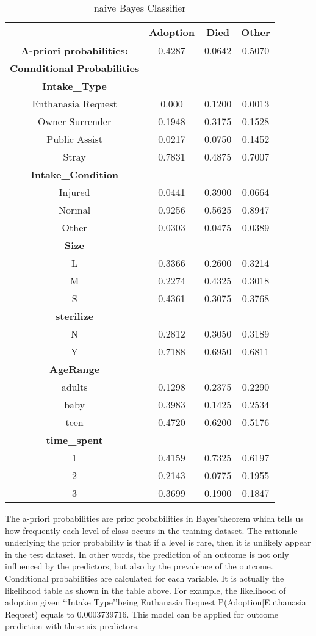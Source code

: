 \documentclass[12pt]{article}
\begin{document}
\begin{flushleft}
\begin{center}
\begin{longtable}{cccc}
\caption{naive Bayes Classifier}\\
\hline
 & \textbf{Adoption} & \textbf{Died} & \textbf{Other} \\
\hline
\textbf{A-priori probabilities:} & 0.4287 & 0.0642 & 0.5070\\ \textbf{Connditional Probabilities} &  &  & \\ \textbf{Intake\_Type} &  & & \\ Enthanasia Request & 0.000 & 0.1200 & 0.0013 \\ Owner Surrender & 0.1948 & 0.3175 & 0.1528 \\ Public Assist & 0.0217 & 0.0750 & 0.1452 \\ Stray & 0.7831 & 0.4875 & 0.7007 \\ \textbf{Intake\_Condition} &  &  &  \\ Injured & 0.0441 & 0.3900 & 0.0664 \\ Normal & 0.9256& 0.5625& 0.8947 \\ Other & 0.0303 & 0.0475 & 0.0389 \\ \textbf{Size} &  &  &  \\ 
L & 0.3366 & 0.2600 & 0.3214 \\ M & 0.2274 & 0.4325 & 0.3018 \\ S & 0.4361 & 0.3075 & 0.3768 \\ \textbf{sterilize} &  &  &  \\ N & 0.2812 & 0.3050 & 0.3189 \\ Y & 0.7188 & 0.6950 & 0.6811 \\ \textbf{AgeRange} &  &  &  \\ adults & 0.1298 & 0.2375 & 0.2290 \\ baby & 0.3983 & 0.1425 & 0.2534 \\ teen &0.4720 & 0.6200 & 0.5176 \\ \textbf{time\_spent} &  &  &  \\ 1 & 0.4159 & 0.7325 & 0.6197 \\ 2 & 0.2143 & 0.0775 & 0.1955 \\
3 & 0.3699 & 0.1900 & 0.1847 \\ \hline
\end{longtable}
\end{center}
The a-priori probabilities are prior probabilities in Bayes\rq\space theorem which tells us how frequently each level of class occurs in the training dataset. The rationale underlying the prior probability is that if a level is rare, then it is unlikely appear in the test dataset. In other words, the prediction of an outcome is not only influenced by the predictors, but also by the prevalence of the outcome. Conditional probabilities are calculated for each variable. It is actually the likelihood table as shown in the table above. For example, the likelihood of adoption given \lq\lq Intake Type\rq\rq\space being Euthanasia Request P(Adoption|Euthanasia Request) equals to 0.0003739716. This model can be applied for outcome prediction with these six predictors.\\


\end{flushleft}
\end{document}
